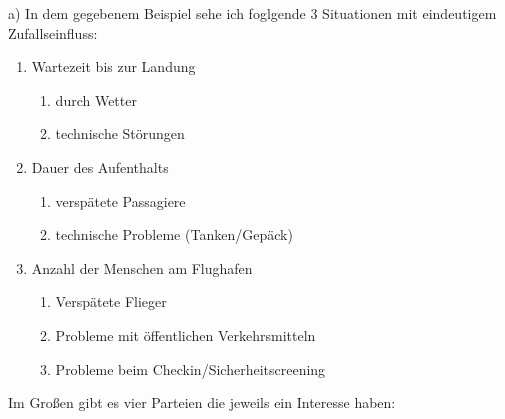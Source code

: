 a) In dem gegebenem Beispiel sehe ich foglgende 3 Situationen mit eindeutigem Zufallseinfluss:

\begin{enumerate}
 \item Wartezeit bis zur Landung
	\begin{enumerate}
	\item durch Wetter
	\item technische Störungen
	\end{enumerate}
 \item Dauer des Aufenthalts
	\begin{enumerate}
	\item verspätete Passagiere
	\item technische Probleme (Tanken/Gepäck)
 	\end{enumerate}
\item Anzahl der Menschen am Flughafen
	\begin{enumerate}
	\item Verspätete Flieger 
	\item Probleme mit öffentlichen Verkehrsmitteln
	\item Probleme beim Checkin/Sicherheitscreening
	\end{enumerate}
\end{enumerate}

Im Großen gibt es vier Parteien die jeweils ein Interesse haben:

